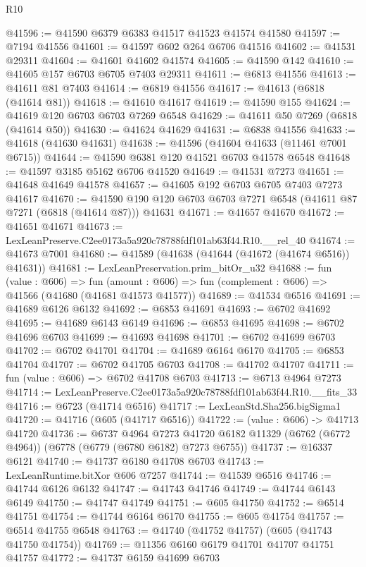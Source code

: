 \begin{lexlean}{R10}
\begin{coremodule}
@41596 := @41590 @6379 @6383 @41517 @41523 @41574 @41580
@41597 := @7194 @41556
@41601 := @41597 @602 @264 @6706 @41516
@41602 := @41531 @29311
@41604 := @41601 @41602 @41574
@41605 := @41590 @142
@41610 := @41605 @157 @6703 @6705 @7403 @29311
@41611 := @6813 @41556
@41613 := @41611 @81 @7403
@41614 := @6819 @41556
@41617 := @41613 (@6818 (@41614 @81))
@41618 := @41610 @41617
@41619 := @41590 @155
@41624 := @41619 @120 @6703 @6703 @7269 @6548
@41629 := @41611 @50 @7269 (@6818 (@41614 @50))
@41630 := @41624 @41629
@41631 := @6838 @41556
@41633 := @41618 (@41630 @41631)
@41638 := @41596 (@41604 @41633 (@11461 @7001 @6715))
@41644 := @41590 @6381 @120 @41521 @6703 @41578 @6548
@41648 := @41597 @3185 @5162 @6706 @41520
@41649 := @41531 @7273
@41651 := @41648 @41649 @41578
@41657 := @41605 @192 @6703 @6705 @7403 @7273 @41617
@41670 := @41590 @190 @120 @6703 @6703 @7271 @6548 (@41611 @87 @7271 (@6818 (@41614 @87))) @41631
@41671 := @41657 @41670
@41672 := @41651 @41671
@41673 := LexLeanPreserve.C2ee0173a5a920c78788fdf101ab63f44.R10.__rel_40
@41674 := @41673 @7001
@41680 := @41589 (@41638 (@41644 (@41672 (@41674 @6516)) @41631))
@41681 := LexLeanPreservation.prim_bitOr_u32
@41688 := fun (value : @606) =>
  fun (amount : @606) => fun (complement : @606) => @41566 (@41680 (@41681 @41573 @41577))
@41689 := @41534 @6516
@41691 := @41689 @6126 @6132
@41692 := @6853 @41691
@41693 := @6702 @41692
@41695 := @41689 @6143 @6149
@41696 := @6853 @41695
@41698 := @6702 @41696 @6703
@41699 := @41693 @41698
@41701 := @6702 @41699 @6703
@41702 := @6702 @41701
@41704 := @41689 @6164 @6170
@41705 := @6853 @41704
@41707 := @6702 @41705 @6703
@41708 := @41702 @41707
@41711 := fun (value : @606) => @6702 @41708 @6703
@41713 := @6713 @4964 @7273
@41714 := LexLeanPreserve.C2ee0173a5a920c78788fdf101ab63f44.R10.__fits_33
@41716 := @6723 (@41714 @6516)
@41717 := LexLeanStd.Sha256.bigSigma1
@41720 := @41716 (@605 (@41717 @6516))
@41722 := (value : @606) -> @41713 @41720
@41736 := @6737
    @4964
    @7273
    @41720
    @6182
    @11329
    (@6762 (@6772 @4964))
    (@6778 (@6779 (@6780 @6182) @7273 @6755))
@41737 := @16337 @6121
@41740 := @41737 @6180 @41708 @6703
@41743 := LexLeanRuntime.bitXor @606 @7257
@41744 := @41539 @6516
@41746 := @41744 @6126 @6132
@41747 := @41743 @41746
@41749 := @41744 @6143 @6149
@41750 := @41747 @41749
@41751 := @605 @41750
@41752 := @6514 @41751
@41754 := @41744 @6164 @6170
@41755 := @605 @41754
@41757 := @6514 @41755 @6548
@41763 := @41740 (@41752 @41757) (@605 (@41743 @41750 @41754))
@41769 := @11356 @6160 @6179 @41701 @41707 @41751 @41757
@41772 := @41737 @6159 @41699 @6703

\end{coremodule}
\end{lexlean}
